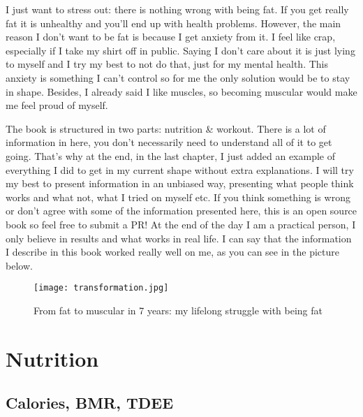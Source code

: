 \documentclass[openany, 12pt]{book}
\begin{document}
	I just want to stress out: there is nothing wrong with being fat. If you get really fat it is unhealthy and you'll end up with 
	health problems. However, the main reason I don't want to be fat is because I get anxiety from it. I feel like crap, especially if I take my shirt 
	off in public. Saying I don't care about it is just lying to myself and I try my best to not do that, just for my mental health. This anxiety is
	something I can't control so for me the only solution would be to stay in shape. Besides, I already said I like muscles, so becoming muscular would
	make me feel proud of myself.
	
	The book is structured in two parts: nutrition \& workout. There is a lot of information in here, you don't necessarily need to understand all of it
	to get going. That's why at the end, in the last chapter, I just added an example of everything I did to get in my current shape without extra explanations. I will try 
	my best to present information in an unbiased way, presenting what people think works and what not, what I tried on myself etc. If you think 
	something is wrong or don't agree with some of the information presented here, this is an open source book so feel free to submit a PR!
	At the end of the day I am a practical person, I only believe in results and what works in real life. 
	I can say that the information I describe in this book worked really well on me, as you can see in the picture below.
	
	\begin{figure}[h]
		\centering
		\texttt{[image: transformation.jpg]}
		\caption{From fat to muscular in 7 years: my lifelong struggle with being fat}
		\label{fig1}
	\end{figure}
	
	
  \chapter{Nutrition}
  
  	\section{Calories, BMR, TDEE}
  	
\end{document}

